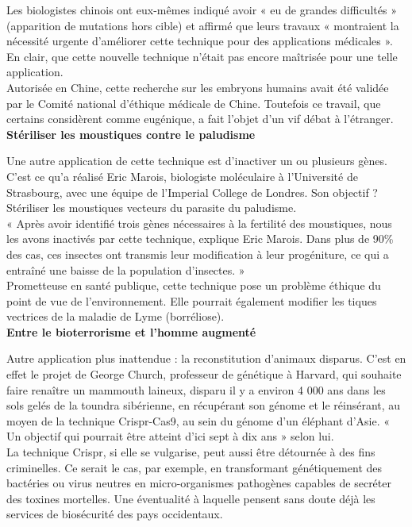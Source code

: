 \documentclass[8pt]{article}
\begin{document}
Les biologistes chinois ont eux-mêmes indiqué avoir « eu de grandes difficultés » (apparition de mutations hors cible) et affirmé que leurs travaux « montraient la nécessité urgente d’améliorer cette technique pour des applications médicales ». En clair, que cette nouvelle technique n’était pas encore maîtrisée pour une telle application.\\

Autorisée en Chine, cette recherche sur les embryons humains avait été validée par le Comité national d’éthique médicale de Chine. Toutefois ce travail, que certains considèrent comme eugénique, a fait l’objet d’un vif débat à l’étranger.\\

\textbf{Stériliser les moustiques contre le paludisme}

Une autre application de cette technique est d’inactiver un ou plusieurs gènes. C’est ce qu’a réalisé Eric Marois, biologiste moléculaire à l’Université de Strasbourg, avec une équipe de l’Imperial College de Londres. Son objectif ? Stériliser les moustiques vecteurs du parasite du paludisme.\\

« Après avoir identifié trois gènes nécessaires à la fertilité des moustiques, nous les avons inactivés par cette technique, explique Eric Marois. Dans plus de 90\% des cas, ces insectes ont transmis leur modification à leur progéniture, ce qui a entraîné une baisse de la population d’insectes. »\\

Prometteuse en santé publique, cette technique pose un problème éthique du point de vue de l’environnement. Elle pourrait également modifier les tiques vectrices de la maladie de Lyme (borréliose).\\

\textbf{Entre le bioterrorisme et l’homme augmenté}

Autre application plus inattendue : la reconstitution d’animaux disparus. C’est en effet le projet de George Church, professeur de génétique à Harvard, qui souhaite faire renaître un mammouth laineux, disparu il y a environ 4 000 ans dans les sols gelés de la toundra sibérienne, en récupérant son génome et le réinsérant, au moyen de la technique Crispr-Cas9, au sein du génome d’un éléphant d’Asie. « Un objectif qui pourrait être atteint d’ici sept à dix ans » selon lui.\\

La technique Crispr, si elle se vulgarise, peut aussi être détournée à des fins criminelles. Ce serait le cas, par exemple, en transformant génétiquement des bactéries ou virus neutres en micro-organismes pathogènes capables de secréter des toxines mortelles. Une éventualité à laquelle pensent sans doute déjà les services de biosécurité des pays occidentaux.\\
\end{document}

